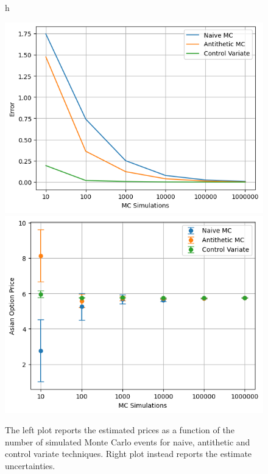 \begin{figure}{h}
  \begin{center}
    \includegraphics[width=0.4\linewidth]{figures/asian_option_price}
    \includegraphics[width=0.4\linewidth]{figures/asian_option_error}
  \end{center}
  \caption{The left plot reports the estimated prices as a function of the number of simulated Monte Carlo events for naive, antithetic and control variate techniques.
    Right plot instead reports the estimate uncertainties.}
  \label{fig:asian_mc_results}
\end{figure}

%